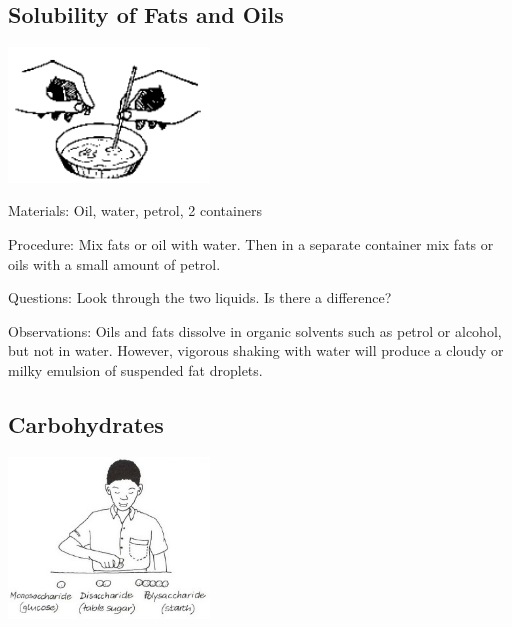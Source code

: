 \begin{multicols}{2}
\subsection{Solubility of Fats and Oils} %

\begin{center}
\includegraphics[width=0.4\textwidth]{./img/source/fats-oils-solubility.png}
\end{center}

\begin{description*}
\item[Materials:]{Oil, water, petrol, 2 containers}
\item[Procedure:]{Mix fats or oil with water. Then in a separate container mix fats or oils with a small amount
of petrol.}
\item[Questions:]{Look through the two liquids. Is there a difference?}
\item[Observations:]{Oils and fats dissolve in organic solvents such as petrol or alcohol, but not in water.
However, vigorous shaking with water will produce a cloudy or milky emulsion of suspended
fat droplets.}
\end{description*}

\subsection{Carbohydrates} %

\begin{center}
\includegraphics[width=0.4\textwidth]{./img/vso/carbohydrates.jpg}
\end{center}


\end{multicols}
